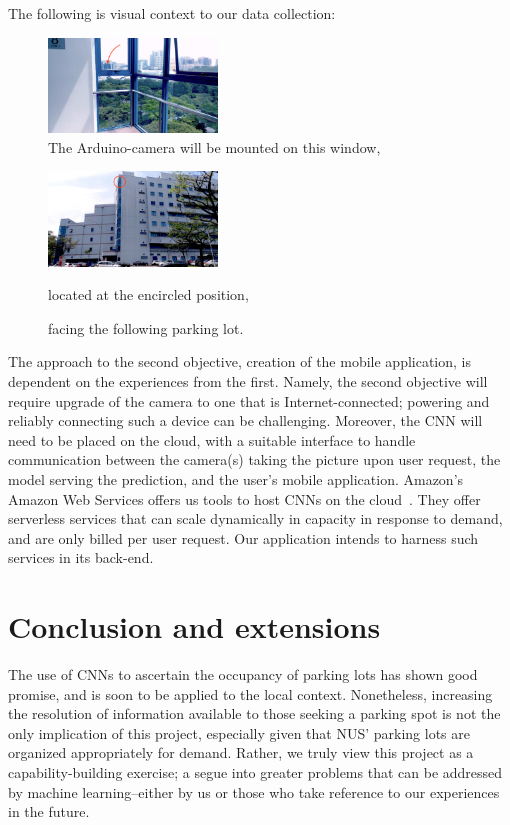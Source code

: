 \documentclass[a4paper, 11pt]{article} %
\begin{document}
		\hspace*{-6mm}The following is visual context to our data collection:
		\vskip 5mm
		\begin{figure}[h]
		    \centering
		    \includegraphics[width=0.4\textwidth]{figures/context.jpg}
		    \caption{The Arduino-camera will be mounted on this window,}
		\end{figure}
	
		\begin{figure}[h]
			\centering
			\includegraphics[width=0.4\textwidth]{figures/context_2.jpg}
			\caption{located at the encircled position,}
			\vskip 5mm
		    \caption{facing the following parking lot.}
		\end{figure}
		\newpage
		The approach to the second objective, creation of the mobile application, is dependent on the 
		experiences from the first. Namely, the second objective will require upgrade of the camera to one 
		that is Internet-connected; powering and reliably connecting such a device can be challenging. 
		Moreover, the CNN will need to be placed on the cloud, with a suitable interface to handle 
		communication between the camera(s) taking the picture upon user request, the model serving 
		the prediction, and the user's mobile application. Amazon's Amazon Web Services offers us tools 
		to host CNNs on the cloud~\cite{aws}\relax. They offer serverless services that can scale 
		dynamically in capacity in response to demand, and are only billed per user request. Our 
		application intends to harness such services in its back-end.
		
\section{Conclusion and extensions}
	The use of CNNs to ascertain the occupancy of parking lots has shown good promise, and is soon 
	to be applied to the local context. Nonetheless, increasing the resolution of information available to 
	those seeking a parking spot is not the only implication of this project, especially given that NUS' 
	parking lots are organized appropriately for demand. Rather, we truly view this project as a 
	capability-building exercise; a segue into greater problems that can be addressed by machine 
	learning--either by us or those who take reference to our experiences in the future.
\end{document}
